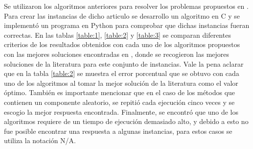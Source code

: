 \documentclass[10pt, twoside]{article}
\begin{document}
Se utilizaron los algoritmos anteriores para resolver los problemas
propuestos en \cite{dataset}. Para crear las instancias de dicho articulo se desarrollo
un algoritmo en C y se implementó un programa en Python para comprobar que dichas
instancias fueran correctas. En las tablas \ref{table:1}, \ref{table:2} y
\ref{table:3} se comparan diferentes criterios de los resultados obtenidos con
cada uno de los algoritmos propuestos con las mejores soluciones encontradas en
\cite{literature}, donde se recogieron las mejores soluciones de la literatura para este
conjunto de instancias. Vale la pena aclarar que en la tabla \ref{table:2} se
muestra el error porcentual que se obtuvo con cada uno de los algoritmos al tomar la mejor
solución de la literatura como el valor óptimo. También es importante mencionar 
que en el caso de los métodos que contienen un componente aleatorio, se repitió
cada ejecución cinco veces y se escogio la mejor respuesta encontrada.
Finalmente, se encontró que uno de los algoritmos requiere de un tiempo de
ejecución demasiado alto, y debido a esto no fue posible encontrar una
respuesta a algunas instancias, para estos casos se utiliza la notación N/A. 
\end{document}
